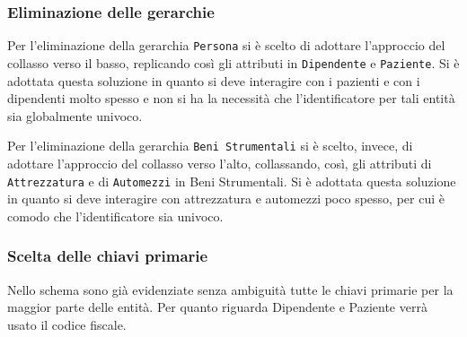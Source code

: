 \documentclass[a4paper, 12pt]{report}
\begin{document}
\subsubsection*{Eliminazione delle gerarchie}
Per l'eliminazione della gerarchia \texttt{Persona} si è scelto di adottare l'approccio del collasso verso il basso,
replicando così gli attributi in \texttt{Dipendente} e \texttt{Paziente}. Si è adottata questa soluzione in quanto si deve interagire
con i pazienti e con i dipendenti molto spesso e non si ha la necessità che l'identificatore per tali entità sia globalmente
univoco. \par
\noindent
Per l'eliminazione della gerarchia \texttt{Beni Strumentali} si è scelto, invece, di adottare l'approccio del collasso verso l'alto,
collassando, così, gli attributi di \texttt{Attrezzatura} e di \texttt{Automezzi} in Beni Strumentali. Si è adottata questa soluzione
in quanto si deve interagire con attrezzatura e automezzi poco spesso, per cui è comodo che l'identificatore sia univoco. 

\subsubsection*{Scelta delle chiavi primarie}
Nello schema sono già evidenziate senza ambiguità tutte le chiavi primarie per la maggior parte delle entità. Per quanto riguarda
Dipendente e Paziente verrà usato il codice fiscale.
\end{document}
